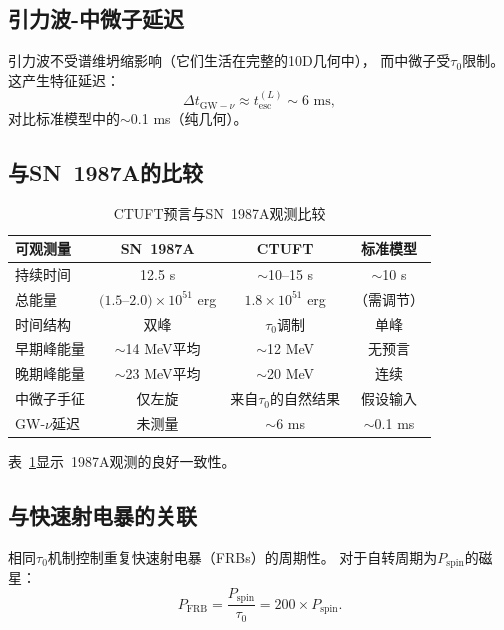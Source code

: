 \documentclass[twocolumn, tightenlines, showpacs, showkeys, nofootinbib]{revtex4-1}
\newcommand{\ctuft}{\textsc{CTUFT}}
\newcommand{\tauzero}{\tau_0}
\begin{document}
\subsection{引力波-中微子延迟}

引力波不受谱维坍缩影响（它们生活在完整的10D几何中），
而中微子受$\tauzero$限制。
这产生特征延迟：
\begin{equation}
    \Delta t_{\text{GW}-\nu} \approx t_{\text{esc}}^{(L)} \sim 6 \text{ ms},
\end{equation}
对比标准模型中的$\sim$0.1 ms（纯几何）。

\subsection{与SN~1987A的比较}

\begin{table}[t]
    \centering
    \caption{CTUFT预言与SN~1987A观测比较}
    \label{tab:sn1987a}
    \begin{tabular}{lccc}
        \toprule
        可观测量 & SN~1987A & \ctuft & 标准模型 \\
        \midrule
        持续时间 & 12.5 s & $\sim$10--15 s & $\sim$10 s \\
        总能量 & $(1.5$--$2.0)\times10^{51}$ erg & $1.8\times10^{51}$ erg & 
                  （需调节） \\
        时间结构 & 双峰 & $\tauzero$调制 & 单峰 \\
        早期峰能量 & $\sim$14 MeV平均 & $\sim$12 MeV & 无预言 \\
        晚期峰能量 & $\sim$23 MeV平均 & $\sim$20 MeV & 连续 \\
        中微子手征 & 仅左旋 & 来自$\tauzero$的自然结果 & 
                    假设输入 \\
        GW-$\nu$延迟 & 未测量 & $\sim$6 ms & $\sim$0.1 ms \\
        \bottomrule
    \end{tabular}
\end{table}

表~\ref{tab:sn1987a}显示~1987A观测的良好一致性。

\subsection{与快速射电暴的关联}

相同$\tauzero$机制控制重复快速射电暴（FRBs）的周期性。
对于自转周期为$P_{\text{spin}}$的磁星：
\begin{equation}
    P_{\text{FRB}} = \frac{P_{\text{spin}}}{\tauzero} = 200 \times P_{\text{spin}}.
\end{equation}
\end{document}
